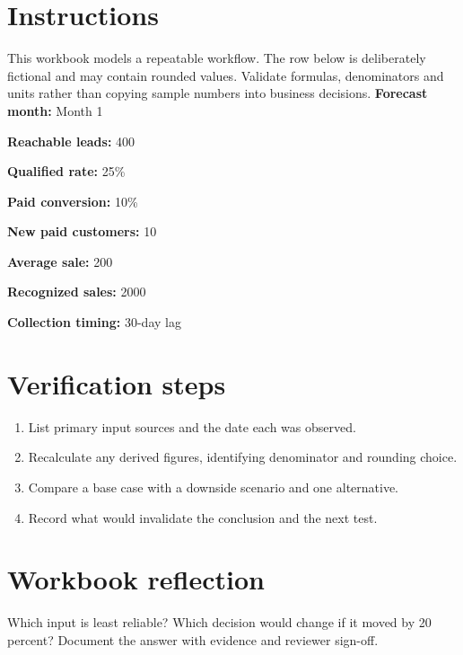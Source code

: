 \documentclass[11pt]{article}
\begin{document}
\SuiteOpen
\section{Instructions}
This workbook models a repeatable workflow. The row below is deliberately fictional and may contain rounded values. Validate formulas, denominators and units rather than copying sample numbers into business decisions.
\noindent\textbf{Forecast month:} Month 1\par\medskip
\noindent\textbf{Reachable leads:} 400\par\medskip
\noindent\textbf{Qualified rate:} 25\%\par\medskip
\noindent\textbf{Paid conversion:} 10\%\par\medskip
\noindent\textbf{New paid customers:} 10\par\medskip
\noindent\textbf{Average sale:} 200\par\medskip
\noindent\textbf{Recognized sales:} 2000\par\medskip
\noindent\textbf{Collection timing:} 30-day lag\par\medskip
\section{Verification steps}
\begin{enumerate}[leftmargin=*,itemsep=5pt]
\item List primary input sources and the date each was observed.
\item Recalculate any derived figures, identifying denominator and rounding choice.
\item Compare a base case with a downside scenario and one alternative.
\item Record what would invalidate the conclusion and the next test.
\end{enumerate}

\section{Workbook reflection}
Which input is least reliable? Which decision would change if it moved by 20 percent? Document the answer with evidence and reviewer sign-off.
\end{document}
